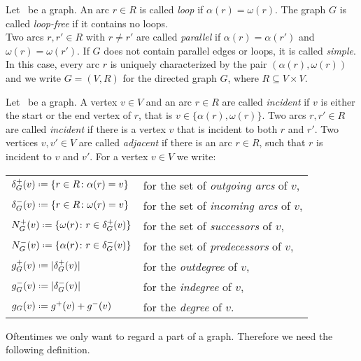 \begin{definition}
	\label{def:loops}
	Let \graph\ be a graph. An arc $r \in R$ is called \textit{loop} if $\alpha(r) = \omega(r)$.  The graph $G$ is called \textit{loop-free} if it contains no loops.\\
	Two arcs $r, r' \in R$ with $r \neq r'$ are called \textit{parallel} if $\alpha(r) = \alpha(r')$ and $\omega(r) = \omega(r')$. If $G$ does not contain parallel edges or loops, it is called \textit{simple}. In this case, every arc $r$ is uniquely characterized by the pair $(\alpha(r), \omega(r))$ and we write $G = (V, R)$ for	the directed graph $G$, where $R \subseteq V \times V$.
\end{definition}

\begin{definition}
	\label{def:adjacencydegree}
	Let \graph\ be a graph. A vertex $v \in V$ and an arc $r \in R$ are called \textit{incident} if $v$ is either the start or the end vertex of $r$, that is $v \in \{ \alpha(r), \omega(r) \}$. Two arcs $r, r' \in R$ are called \textit{incident} if there is a vertex $v$ that is incident to both $r$ and $r'$. Two vertices $v, v' \in V$ are called \textit{adjacent} if there is an arc $r \in R$, such that $r$ is incident to $v$ and $v'$. For a vertex $v \in V$ we write:\medskip
	
	\begin{tabular}{ll}
		$\delta_G^+(v) \defeq  \{r \in R \colon \alpha(r) = v  \}$ & for the set of \textit{outgoing arcs} of $v$,\\
		$\delta_G^-(v) \defeq  \{r \in R \colon \omega(r) = v  \}$ & for the set of \textit{incoming arcs} of $v$,\\
		$N_G^+(v) \defeq  \{ \omega(r) \colon r \in \delta_G^+(v)  \}$ & for the set of \textit{successors} of $v$, \\
		$N_G^-(v) \defeq  \{ \alpha(r) \colon r \in \delta_G^-(v)  \}$ & for the set of \textit{predecessors} of $v$,\\
		$g_G^+(v) \defeq |\delta_G^+(v)|$ & for the \textit{outdegree} of $v$,\\
		$g_G^-(v) \defeq |\delta_G^-(v)|$ & for the \textit{indegree} of $v$,\\
		$g_G(v) \defeq g^+(v) + g^-(v)$ & for the \textit{degree} of $v$.
	\end{tabular}
\end{definition}

Oftentimes we only want to regard a part of a graph. Therefore we need the following definition.

